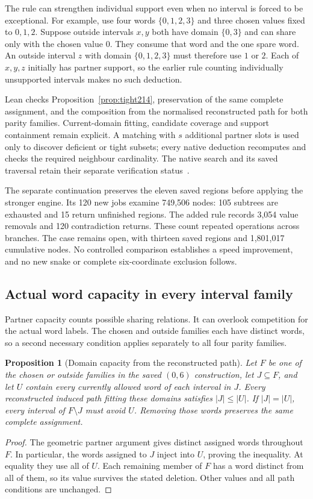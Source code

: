 \documentclass[11pt,a4paper]{article}
\newtheorem{proposition}[theorem]{Proposition}
\theoremstyle{definition}
\theoremstyle{remark}
\begin{document}
The rule can strengthen individual support even when no interval is
forced to be exceptional. For example, use four words $\{0,1,2,3\}$
and three chosen values fixed to $0,1,2$. Suppose outside intervals
$x,y$ both have domain $\{0,3\}$ and can share only with the chosen
value $0$. They consume that word and the one spare word. An outside
interval $z$ with domain $\{0,1,2,3\}$ must therefore use $1$ or $2$.
Each of $x,y,z$ initially has partner support, so the earlier rule
counting individually unsupported intervals makes no such deduction.

Lean checks Proposition~\ref{prop:tight214}, preservation of the
same complete assignment, and the composition from the normalised
reconstructed path for both parity families. Current-domain fitting,
candidate coverage and support containment remain explicit.
A matching with $s$ additional partner slots
is used only to discover deficient or tight subsets; every native
deduction recomputes and checks the required neighbour cardinality.
The native search and its saved traversal retain their separate
verification status~\cite{research214}.

The separate continuation preserves the eleven saved regions before
applying the stronger engine. Its 120 new jobs examine 749,506 nodes:
105 subtrees are exhausted and 15 return unfinished regions. The added
rule records 3,054 value removals and 120 contradiction returns.
These count repeated operations across branches. The case remains
open, with thirteen saved regions and 1,801,017 cumulative nodes.
No controlled comparison establishes a speed improvement, and no new
snake or complete six-coordinate exclusion follows.


\subsection{Actual word capacity in every interval family}
\label{sec:word215}
Partner capacity counts possible sharing relations. It can overlook
competition for the actual word labels. The chosen and outside
families each have distinct words, so a second necessary condition
applies separately to all four parity families.

\begin{proposition}[Domain capacity from the reconstructed path]\label{prop:word215}
Let $F$ be one of the chosen or outside families in the saved $(0,6)$
construction, let $J\subseteq F$, and let $U$ contain every currently
allowed word of each interval in $J$. Every reconstructed induced
path fitting these domains satisfies $|J|\le |U|$.
If $|J|=|U|$, every interval of $F\setminus J$ must avoid $U$.
Removing those words preserves the same complete assignment.
\end{proposition}
\begin{proof}
The geometric partner argument gives distinct assigned words throughout
$F$. In particular, the words assigned to $J$ inject into $U$, proving
the inequality. At equality they use all of $U$. Each remaining member
of $F$ has a word distinct from all of them, so its value survives
the stated deletion. Other values and all path conditions are unchanged.
\end{proof}
\end{document}
